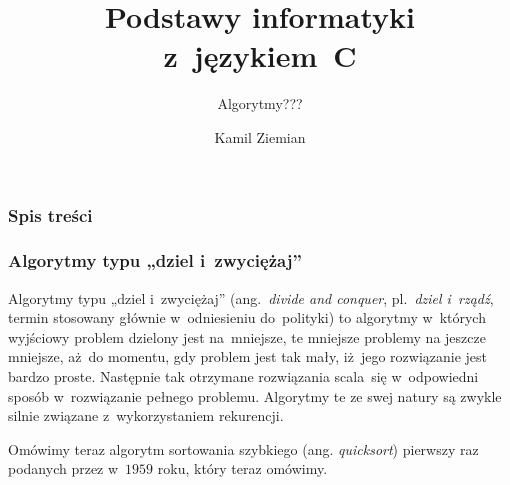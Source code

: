 \documentclass[10pt,t]{beamer}
\title{Podstawy informatyki z~językiem~C}
\subtitle{Algorytmy???}
\author{Kamil Ziemian \\
  \email}
\begin{document}





\RaggedRight





\maketitle





\begin{frame}
  \frametitle{Spis treści}


  \tableofcontents

\end{frame}










\begin{frame}
  \frametitle{Algorytmy typu „dziel i~zwyciężaj”}


  Algorytmy typu „dziel i~zwyciężaj” (ang.~\textit{divide and conquer},
  pl.~\textit{dziel i~rządź}, termin stosowany głównie w~odniesieniu
  do~polityki) to algorytmy w~których wyjściowy problem dzielony jest
  na~mniejsze, te mniejsze problemy na jeszcze mniejsze, aż~do momentu,
  gdy problem jest tak mały, iż~jego rozwiązanie jest bardzo proste.
  Następnie tak otrzymane rozwiązania scala~się w~odpowiedni sposób
  w~rozwiązanie pełnego problemu. Algorytmy te ze swej natury są zwykle
  silnie związane z~wykorzystaniem rekurencji.

  Omówimy teraz algorytm sortowania szybkiego (ang. \textit{quicksort})
  pierwszy raz podanych przez
  w~$1959$ roku, który teraz omówimy.

\end{frame}
\end{document}
